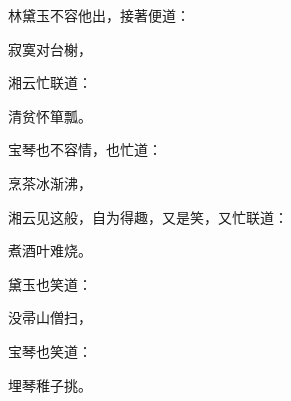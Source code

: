 \begin{parag}
    林黛玉不容他出，接著便道：
\end{parag}


\begin{poem}
    \begin{pl} 寂寞对台榭，\end{pl}
\end{poem}


\begin{parag}
    湘云忙联道：
\end{parag}


\begin{poem}
    \begin{pl} 清贫怀箪瓢。\end{pl}
\end{poem}


\begin{parag}
    宝琴也不容情，也忙道：
\end{parag}


\begin{poem}
    \begin{pl} 烹茶冰渐沸，\end{pl}
\end{poem}


\begin{parag}
    湘云见这般，自为得趣，又是笑，又忙联道：
\end{parag}


\begin{poem}
    \begin{pl} 煮酒叶难烧。\end{pl}
\end{poem}


\begin{parag}
    黛玉也笑道：
\end{parag}


\begin{poem}
    \begin{pl} 没帚山僧扫，\end{pl}
\end{poem}


\begin{parag}
    宝琴也笑道：
\end{parag}


\begin{poem}
    \begin{pl} 埋琴稚子挑。\end{pl}
\end{poem}


